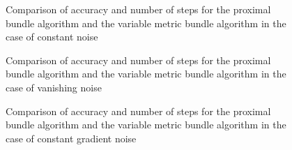 \vspace{-1.5em}

\begin{figure}[H]
	\begin{subfigure}{0.49\textwidth}
	\end{subfigure}
	\begin{subfigure}{0.49\textwidth}
	\end{subfigure}
	\vspace{-.5em}
	\caption[Accuracy and number of steps:constant noise, higher dimensions]{Comparison of accuracy and number of steps for the proximal bundle algorithm and the variable metric bundle algorithm in the case of constant noise}%
	\label{fig_const_noise_large}%
\end{figure}

\vspace{-1.5em}

\begin{figure}[H]
	\begin{subfigure}{0.49\textwidth}
	\end{subfigure}
	\begin{subfigure}{0.49\textwidth}
	\end{subfigure}
	\caption[Accuracy and number of steps: vanishing noise, higher dimensions]{Comparison of accuracy and number of steps for the proximal bundle algorithm and the variable metric bundle algorithm in the case of vanishing noise}%
	\label{fig_van_noise_large}%
\end{figure}

\vspace{-1.5em}

\begin{figure}[H]
	\begin{subfigure}{0.49\textwidth}
	\end{subfigure}
	\begin{subfigure}{0.49\textwidth}
	\end{subfigure}
	\caption[Accuracy and number of steps: constant gradient noise, higher dimensions]{Comparison of accuracy and number of steps for the proximal bundle algorithm and the variable metric bundle algorithm in the case of constant gradient noise}%
	\label{fig_const_grad_noise_large}%
\end{figure}


